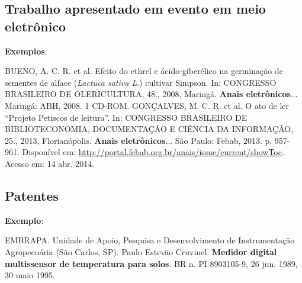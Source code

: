 \subsection{Trabalho apresentado em evento em meio eletrônico}

\begin{flushleft}
\begin{singlespace}
\end{singlespace}
\end{flushleft}

\begin{exemplomanual}
\textbf{Exemplos}:\\
\begin{singlespace}
BUENO, A. C. R. et al. Efeito do ethrel e ácido-giberélico na germinação de sementes de alface (\textit{Lactuca sativa L}.) cultivar Simpson. In: CONGRESSO BRASILEIRO DE OLERICULTURA, 48., 2008, Maringá. \textbf{Anais eletrônicos}... Maringá: ABH, 2008. 1 CD-ROM.
\newline
\newline
GONÇALVES, M. C. R. et al. O ato de ler ``Projeto Petiscos de leitura''. In: CONGRESSO BRASILEIRO DE BIBLIOTECONOMIA, DOCUMENTAÇÃO E CIÊNCIA DA INFORMAÇÃO, 25., 2013, Florianópolis. \textbf{Anais eletrônicos}... São Paulo: Febab, 2013. p. 957-961. Disponível em: \url{http://portal.febab.org.br/anais/issue/current/showToc}. Acesso em: 14 abr. 2014.
\end{singlespace}
\end{exemplomanual}


\subsection{Patentes}

\begin{flushleft}
\begin{singlespace}
\end{singlespace}
\end{flushleft}

\begin{exemplomanual}
\textbf{Exemplo}:\\
\begin{singlespace}
EMBRAPA. Unidade de Apoio, Pesquisa e Desenvolvimento de Instrumentação Agropecuária (São Carlos, SP). Paulo Estevão Cruvinel. \textbf{Medidor digital multissensor de temperatura para solos}. BR n. PI 8903105-9, 26 jun. 1989, 30 maio 1995.
\end{singlespace}
\end{exemplomanual}


